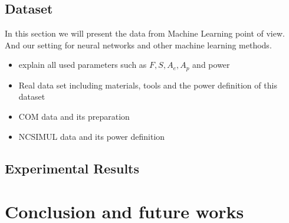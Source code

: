 \documentclass{article}
\begin{document}
\subsection{Dataset}
In this section we will present the data from Machine Learning point of view. And our setting for neural networks and other machine learning methods.
\begin{itemize}
\item explain all used parameters such as $F, S, A_e, A_p$ and power 
\item Real data set including materials, tools and the power definition of this dataset
\item COM data and its preparation 
\item NCSIMUL data and its power definition
\end{itemize} 
\subsection{Experimental Results}
 
\section{Conclusion and future works}



\end{document}
